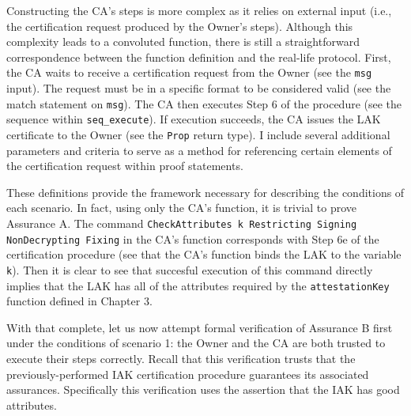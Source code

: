 Constructing the CA's steps is more complex as it relies on external input (i.e., the certification request produced by the Owner's steps). Although this complexity leads to a convoluted function, there is still a straightforward correspondence between the function definition and the real-life protocol. First, the CA waits to receive a certification request from the Owner (see the \verb|msg| input). The request must be in a specific format to be considered valid (see the match statement on \verb|msg|). The CA then executes Step 6 of the procedure (see the sequence within \verb|seq_execute|). If execution succeeds, the CA issues the LAK certificate to the Owner (see the \verb|Prop| return type). I include several additional parameters and criteria to serve as a method for referencing certain elements of the certification request within proof statements.



These definitions provide the framework necessary for describing the conditions of each scenario. 
In fact, using only the CA's function, it is trivial to prove Assurance A. The command  \verb|CheckAttributes k Restricting Signing NonDecrypting Fixing| in the CA's function corresponds with Step 6e of the certification procedure 
(see that the CA's function binds the LAK to the variable \verb|k|). Then it is clear to see that succesful execution of this command directly implies that the LAK has all of the attributes required by the \verb|attestationKey| function defined in Chapter 3.

With that complete, let us now attempt formal verification of Assurance B first under the conditions of scenario 1: the Owner and the CA are both trusted to execute their steps correctly. 
Recall that this verification trusts that the previously-performed IAK certification procedure guarantees its associated assurances. Specifically this verification uses the assertion that the IAK has good attributes.

